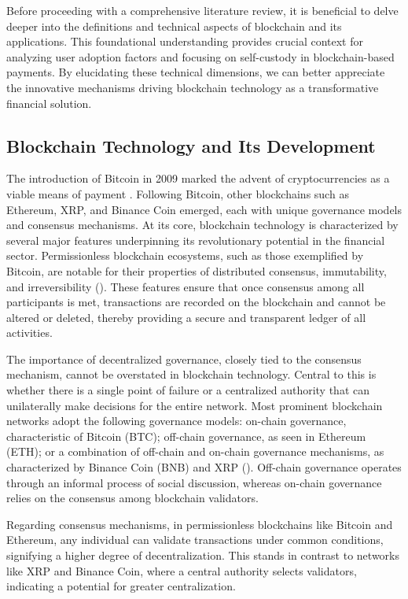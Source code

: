 \documentclass[twocolumn]{article}
\begin{document}
Before proceeding with a comprehensive literature review, it is beneficial to delve deeper into the definitions and technical aspects of blockchain and its applications. This foundational understanding provides crucial context for analyzing user adoption factors and focusing on self-custody in blockchain-based payments. By elucidating these technical dimensions, we can better appreciate the innovative mechanisms driving blockchain technology as a transformative financial solution.

\subsection{Blockchain Technology and Its Development}

The introduction of Bitcoin in 2009 marked the advent of cryptocurrencies as a viable means of payment \cite{nakamoto_bitcoin_2009}. Following Bitcoin, other blockchains such as Ethereum, XRP, and Binance Coin emerged, each with unique governance models and consensus mechanisms. At its core, blockchain technology is characterized by several major features underpinning its revolutionary potential in the financial sector. Permissionless blockchain ecosystems, such as those exemplified by Bitcoin, are notable for their properties of distributed consensus, immutability, and irreversibility (\cite{moniruzzaman_examining_2020}). These features ensure that once consensus among all participants is met, transactions are recorded on the blockchain and cannot be altered or deleted, thereby providing a secure and transparent ledger of all activities.

The importance of decentralized governance, closely tied to the consensus mechanism, cannot be overstated in blockchain technology. Central to this is whether there is a single point of failure or a centralized authority that can unilaterally make decisions for the entire network. Most prominent blockchain networks adopt the following governance models: on-chain governance, characteristic of Bitcoin (BTC); off-chain governance, as seen in Ethereum (ETH); or a combination of off-chain and on-chain governance mechanisms, as characterized by Binance Coin (BNB) and XRP (\cite{rochard_bitcoin_2020, lee_analysis_2023, noauthor_ethereum_2023, noauthor_governance_2023}). Off-chain governance operates through an informal process of social discussion, whereas on-chain governance relies on the consensus among blockchain validators.

Regarding consensus mechanisms, in permissionless blockchains like Bitcoin and Ethereum, any individual can validate transactions under common conditions, signifying a higher degree of decentralization. This stands in contrast to networks like XRP and Binance Coin, where a central authority selects validators, indicating a potential for greater centralization.
\end{document}
